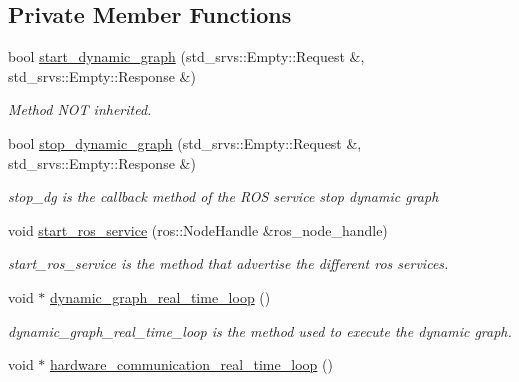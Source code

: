 \subsection*{Private Member Functions}
\begin{DoxyCompactItemize}
\item 
bool \hyperlink{classdynamic__graph_1_1DynamicGraphManager_a664c7a3810c13a33057ae060281966b1}{start\+\_\+dynamic\+\_\+graph} (std\+\_\+srvs\+::\+Empty\+::\+Request \&, std\+\_\+srvs\+::\+Empty\+::\+Response \&)
\begin{DoxyCompactList}\small\item\em Method N\+OT inherited. \end{DoxyCompactList}\item 
bool \hyperlink{classdynamic__graph_1_1DynamicGraphManager_a06740416640f3464edbbb57ee759b8fb}{stop\+\_\+dynamic\+\_\+graph} (std\+\_\+srvs\+::\+Empty\+::\+Request \&, std\+\_\+srvs\+::\+Empty\+::\+Response \&)
\begin{DoxyCompactList}\small\item\em stop\+\_\+dg is the callback method of the R\+OS service stop dynamic graph \end{DoxyCompactList}\item 
void \hyperlink{classdynamic__graph_1_1DynamicGraphManager_aa396c4c91c076a103e2d5cb6c5606a7d}{start\+\_\+ros\+\_\+service} (ros\+::\+Node\+Handle \&ros\+\_\+node\+\_\+handle)\hypertarget{classdynamic__graph_1_1DynamicGraphManager_aa396c4c91c076a103e2d5cb6c5606a7d}{}\label{classdynamic__graph_1_1DynamicGraphManager_aa396c4c91c076a103e2d5cb6c5606a7d}

\begin{DoxyCompactList}\small\item\em start\+\_\+ros\+\_\+service is the method that advertise the different ros services. \end{DoxyCompactList}\item 
void $\ast$ \hyperlink{classdynamic__graph_1_1DynamicGraphManager_a72f9e755719ec8fde8f145a67b518333}{dynamic\+\_\+graph\+\_\+real\+\_\+time\+\_\+loop} ()\hypertarget{classdynamic__graph_1_1DynamicGraphManager_a72f9e755719ec8fde8f145a67b518333}{}\label{classdynamic__graph_1_1DynamicGraphManager_a72f9e755719ec8fde8f145a67b518333}

\begin{DoxyCompactList}\small\item\em dynamic\+\_\+graph\+\_\+real\+\_\+time\+\_\+loop is the method used to execute the dynamic graph. \end{DoxyCompactList}\item 
void $\ast$ \hyperlink{classdynamic__graph_1_1DynamicGraphManager_a4ea4183f1a4bd2d450ffb4a0a22b4242}{hardware\+\_\+communication\+\_\+real\+\_\+time\+\_\+loop} ()\hypertarget{classdynamic__graph_1_1DynamicGraphManager_a4ea4183f1a4bd2d450ffb4a0a22b4242}{}\label{classdynamic__graph_1_1DynamicGraphManager_a4ea4183f1a4bd2d450ffb4a0a22b4242}


\end{DoxyCompactItemize}
